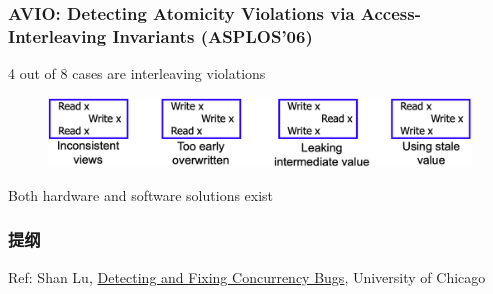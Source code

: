 % 
% 
% 
\begin{frame}[fragile]
    \frametitle{AVIO: \small{Detecting Atomicity Violations via Access-Interleaving Invariants (ASPLOS’06)}}

4 out of 8 cases are interleaving violations

    \begin{figure}
    \includegraphics[width=1.0\linewidth]{figs/interleaving-violations.png}
    \end{figure} \pause

Both hardware and software solutions exist

\end{frame}
% 
% 
% 
% 
% 
% 
% 
\begin{frame}
\frametitle{提纲} %
\tableofcontents %

Ref: Shan Lu, \href{https://s4plus.ustc.edu.cn/_upload/article/files/84/48/964812c049829f4538793b862187/430bcb14-7aa7-4689-b340-9c81e735e5eb.pdf}{Detecting and Fixing Concurrency Bugs}, University of Chicago

\end{frame}
